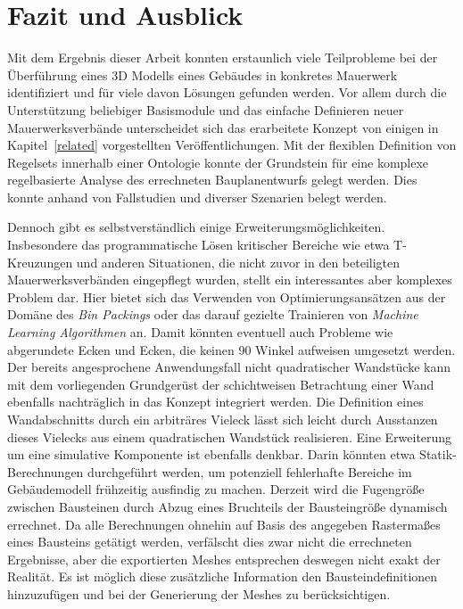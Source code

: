 \chapter{Fazit und Ausblick}
Mit dem Ergebnis dieser Arbeit konnten erstaunlich viele Teilprobleme bei der Überführung eines 3D Modells eines Gebäudes in konkretes Mauerwerk identifiziert und für viele davon Lösungen gefunden werden.
Vor allem durch die Unterstützung beliebiger Basismodule und das einfache Definieren neuer Mauerwerksverbände unterscheidet sich das erarbeitete Konzept von einigen in Kapitel~\ref{related} vorgestellten Veröffentlichungen.
Mit der flexiblen Definition von Regelsets innerhalb einer Ontologie konnte der Grundstein für eine komplexe regelbasierte Analyse des errechneten Bauplanentwurfs gelegt werden.
Dies konnte anhand von Fallstudien und diverser Szenarien belegt werden.

Dennoch gibt es selbstverständlich einige Erweiterungsmöglichkeiten.
Insbesondere das programmatische Lösen kritischer Bereiche wie etwa T-Kreuzungen und anderen Situationen, die nicht zuvor in den beteiligten Mauerwerksverbänden eingepflegt wurden, stellt ein interessantes aber komplexes Problem dar.
Hier bietet sich das Verwenden von Optimierungsansätzen aus der Domäne des \textit{Bin Packings} oder das darauf gezielte Trainieren von \textit{Machine Learning Algorithmen} an.
Damit könnten eventuell auch Probleme wie abgerundete Ecken und Ecken, die keinen 90\textdegree{} Winkel aufweisen umgesetzt werden.
Der bereits angesprochene Anwendungsfall nicht quadratischer Wandstücke kann mit dem vorliegenden Grundgerüst der schichtweisen Betrachtung einer Wand ebenfalls nachträglich in das Konzept integriert werden.
Die Definition eines Wandabschnitts durch ein arbiträres Vieleck lässt sich leicht durch \glqq{}Ausstanzen\grqq{} dieses Vielecks aus einem quadratischen Wandstück realisieren.
Eine Erweiterung um eine simulative Komponente ist ebenfalls denkbar.
Darin könnten etwa Statik-Berechnungen durchgeführt werden, um potenziell fehlerhafte Bereiche im Gebäudemodell frühzeitig ausfindig zu machen.
Derzeit wird die Fugengröße zwischen Bausteinen durch Abzug eines Bruchteils der Bausteingröße dynamisch errechnet.
Da alle Berechnungen ohnehin auf Basis des angegeben Rastermaßes eines Bausteins getätigt werden, verfälscht dies zwar nicht die errechneten Ergebnisse, aber die exportierten Meshes entsprechen deswegen nicht exakt der Realität.
Es ist möglich diese zusätzliche Information den Bausteindefinitionen hinzuzufügen und bei der Generierung der Meshes zu berücksichtigen.